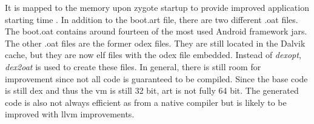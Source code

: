 It is mapped to the memory upon zygote startup to provide improved application starting time .
In addition to the boot.art file, there are two different .oat files.
The boot.oat contains around fourteen of the most used Android framework \gls{jar}s.
The other .oat files are the former \gls{odex} files.
They are still located in the Dalvik cache, but they are now \gls{elf} files with the odex file embedded.
Instead of \textit{dexopt}, \textit{dex2oat} is used to create these files. \cite{andevconDalvikART} \cite{developersConfigureArt} \cite{androidArt} \cite{intelArt}
\newline
In general, there is still room for improvement since not all code is guaranteed to be compiled.
Since the base code is still dex and thus the \gls{vm} is still 32 bit, \gls{art} is not fully 64 bit.
The generated code is also not always efficient as from a native compiler but is likely to be improved with \gls{llvm} improvements.
